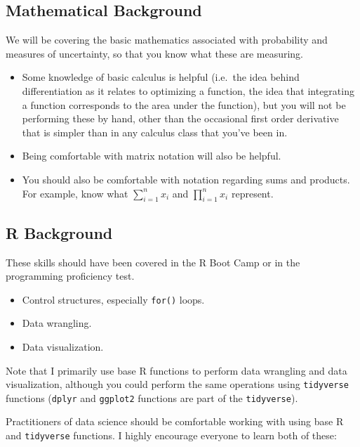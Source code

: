 \documentclass[
]{book}
\providecommand{\tightlist}{%
  \setlength{\itemsep}{0pt}\setlength{\parskip}{0pt}}
\begin{document}
\hypertarget{mathematical-background}{%
\subsection*{Mathematical Background}\label{mathematical-background}}

We will be covering the basic mathematics associated with probability and measures of uncertainty, so that you know what these are measuring.

\begin{itemize}
\item
  Some knowledge of basic calculus is helpful (i.e.~the idea behind differentiation as it relates to optimizing a function, the idea that integrating a function corresponds to the area under the function), but you will not be performing these by hand, other than the occasional first order derivative that is simpler than in any calculus class that you've been in.
\item
  Being comfortable with matrix notation will also be helpful.
\item
  You should also be comfortable with notation regarding sums and products. For example, know what \(\sum_{i=1}^n x_i\) and \(\prod_{i=1}^n x_i\) represent.
\end{itemize}

\hypertarget{r-background}{%
\subsection*{R Background}\label{r-background}}

These skills should have been covered in the R Boot Camp or in the programming proficiency test.

\begin{itemize}
\tightlist
\item
  Control structures, especially \texttt{for()} loops.
\item
  Data wrangling.
\item
  Data visualization.
\end{itemize}

Note that I primarily use base R functions to perform data wrangling and data visualization, although you could perform the same operations using \texttt{tidyverse} functions (\texttt{dplyr} and \texttt{ggplot2} functions are part of the \texttt{tidyverse}).

Practitioners of data science should be comfortable working with using base R and \texttt{tidyverse} functions. I highly encourage everyone to learn both of these:
\end{document}
